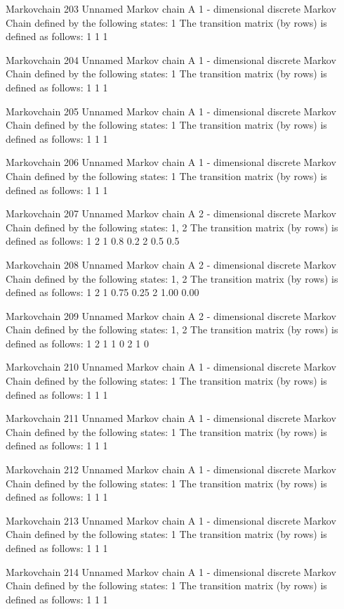 \documentclass[
  nojss]{jss}
\begin{document}
\begin{CodeChunk}
\begin{CodeOutput}
Markovchain  203 
Unnamed Markov chain 
 A  1 - dimensional discrete Markov Chain defined by the following states: 
 1 
 The transition matrix  (by rows)  is defined as follows: 
  1
1 1

Markovchain  204 
Unnamed Markov chain 
 A  1 - dimensional discrete Markov Chain defined by the following states: 
 1 
 The transition matrix  (by rows)  is defined as follows: 
  1
1 1

Markovchain  205 
Unnamed Markov chain 
 A  1 - dimensional discrete Markov Chain defined by the following states: 
 1 
 The transition matrix  (by rows)  is defined as follows: 
  1
1 1

Markovchain  206 
Unnamed Markov chain 
 A  1 - dimensional discrete Markov Chain defined by the following states: 
 1 
 The transition matrix  (by rows)  is defined as follows: 
  1
1 1

Markovchain  207 
Unnamed Markov chain 
 A  2 - dimensional discrete Markov Chain defined by the following states: 
 1, 2 
 The transition matrix  (by rows)  is defined as follows: 
    1   2
1 0.8 0.2
2 0.5 0.5

Markovchain  208 
Unnamed Markov chain 
 A  2 - dimensional discrete Markov Chain defined by the following states: 
 1, 2 
 The transition matrix  (by rows)  is defined as follows: 
     1    2
1 0.75 0.25
2 1.00 0.00

Markovchain  209 
Unnamed Markov chain 
 A  2 - dimensional discrete Markov Chain defined by the following states: 
 1, 2 
 The transition matrix  (by rows)  is defined as follows: 
  1 2
1 1 0
2 1 0

Markovchain  210 
Unnamed Markov chain 
 A  1 - dimensional discrete Markov Chain defined by the following states: 
 1 
 The transition matrix  (by rows)  is defined as follows: 
  1
1 1

Markovchain  211 
Unnamed Markov chain 
 A  1 - dimensional discrete Markov Chain defined by the following states: 
 1 
 The transition matrix  (by rows)  is defined as follows: 
  1
1 1

Markovchain  212 
Unnamed Markov chain 
 A  1 - dimensional discrete Markov Chain defined by the following states: 
 1 
 The transition matrix  (by rows)  is defined as follows: 
  1
1 1

Markovchain  213 
Unnamed Markov chain 
 A  1 - dimensional discrete Markov Chain defined by the following states: 
 1 
 The transition matrix  (by rows)  is defined as follows: 
  1
1 1

Markovchain  214 
Unnamed Markov chain 
 A  1 - dimensional discrete Markov Chain defined by the following states: 
 1 
 The transition matrix  (by rows)  is defined as follows: 
  1
1 1


\end{CodeOutput}
\end{CodeChunk}
\end{document}
